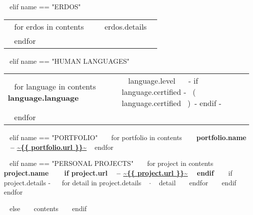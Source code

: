 \begin{minipage}{\textwidth}
~{ elif name == "ERDOS" }~

\begin{tabular}{ @{} p{32mm} p{135mm} @{} }
  ~{ for erdos in contents }~
  \small \textcolor{gray}{{\emph{ }}} & {\small ~{{ erdos.details }}~} \\
  ~{ endfor }~
\end{tabular}



~{ elif name == "HUMAN LANGUAGES" }~
  \begin{tabular}{ @{} p{32mm} p{135mm} @{} }
  ~{ for language in contents }~
    \bf {~{{ language.language }}~} & {\small ~{{ language.level }}~ ~{- if language.certified -}~ \small\color{maingrey}\hspace{1mm}(~{{ language.certified }}~)~{- endif -}~} \\
  ~{ endfor }~
  \end{tabular}
  \vspace{50mm}


~{ elif name == "PORTFOLIO" }~
  ~{ for portfolio in contents }~
    {\bf ~{{ portfolio.name }}~ -- \color{maincolor}\url{~{{ portfolio.url }}~} }
    \vspace{1mm}
  ~{ endfor }~
  \vspace{5mm}


~{ elif name == "PERSONAL PROJECTS" }~
  ~{ for project in contents }~
    {\small\bf ~{{ project.name }}~ ~{ if project.url }~ -- \color{maincolor}\url{~{{ project.url }}~} ~{ endif }~ }
    \vspace{1mm}
    ~{ if project.details -}~
    ~{ for detail in project.details }~
      $\cdot$ \small ~{{ detail }}~
    ~{ endfor }~
    ~{ endif }~
    \vspace{3mm}
  ~{ endfor }~
  \vspace{15mm}


\vspace{10mm}
~{ else }~
  ~{{ contents }}~
  \bigskip
~{ endif }~
\end{minipage}


